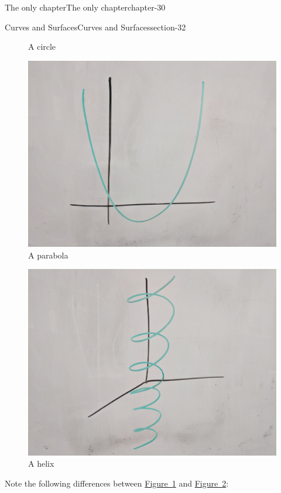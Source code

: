 \documentclass[oneside,10pt,]{book}
\begin{document}
\begin{chapterptx}{The only chapter}{}{The only chapter}{}{}{chapter-30}
\begin{sectionptx}{Curves and Surfaces}{}{Curves and Surfaces}{}{}{section-32}
\begin{figure}
\caption{A circle\label{figure-48}}
\end{figure}
\begin{figure}
\centering
\includegraphics[width=1\linewidth]{images/parabola.jpg}
\caption{A parabola\label{figure-51}}
\end{figure}
\begin{figure}
\centering
\includegraphics[width=1\linewidth]{images/helix.jpg}
\caption{A helix\label{figure-54}}
\end{figure}
\hypertarget{p-57}{}%
Note the following differences between \hyperref[figure-48]{Figure~\ref{figure-48}} and \hyperref[figure-51]{Figure~\ref{figure-51}}:%
\leavevmode%
\begin{itemize}[label=\textbullet]

\end{itemize}
\end{sectionptx}
\end{chapterptx}
\end{document}
